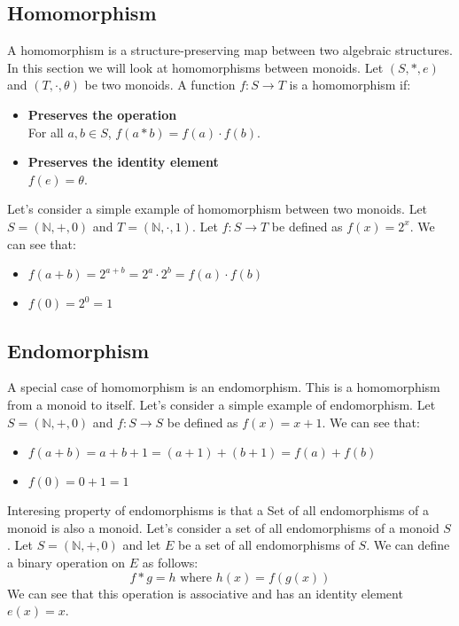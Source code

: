 \documentclass{article}
\begin{document}
\subsection{Homomorphism}
A homomorphism is a structure-preserving map between two algebraic structures.
In this section we will look at homomorphisms between monoids.
Let \( (S, \ast, e) \) and \( (T, \cdot, \theta) \) be two monoids.
A function \( f: S \to T \) is a homomorphism if:
\begin{itemize}
    \item \textbf{Preserves the operation} \\
    For all \( a, b \in S \), \( f(a \ast b) = f(a) \cdot f(b) \).
    \item \textbf{Preserves the identity element} \\
    \( f(e) = \theta \).
\end{itemize}
Let's consider a simple example of homomorphism between two monoids.
Let \( S = (\mathbb{N}, +, 0) \) and \( T = (\mathbb{N}, \cdot, 1) \).
Let \( f: S \to T \) be defined as \( f(x) = 2^x \).
We can see that:
\begin{itemize}
    \item \( f(a + b) = 2^{a + b} = 2^a \cdot 2^b = f(a) \cdot f(b) \)
    \item \( f(0) = 2^0 = 1 \)
\end{itemize}
\subsection{Endomorphism}
A special case of homomorphism is an endomorphism.
This is a homomorphism from a monoid to itself.
Let's consider a simple example of endomorphism.
Let \( S = (\mathbb{N}, +, 0) \) and \( f: S \to S \) be defined as \( f(x) = x + 1 \).
We can see that:
\begin{itemize}
    \item \( f(a + b) = a + b + 1 = (a + 1) + (b + 1) = f(a) + f(b) \)
    \item \( f(0) = 0 + 1 = 1 \)
\end{itemize}
Interesing property of endomorphisms is that a Set of all endomorphisms of a monoid is also a monoid.
Let's consider a set of all endomorphisms of a monoid \( S \).
Let \( S = (\mathbb{N}, +, 0) \) and let \( E \) be a set of all endomorphisms of \( S \).
We can define a binary operation on \( E \) as follows:
\begin{equation}
    f \ast g = h \text{ where } h(x) = f(g(x))
\end{equation}
We can see that this operation is associative and has an identity element \( e(x) = x \).
\end{document}
